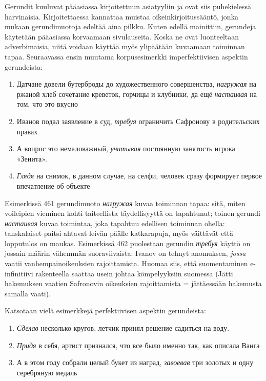 \documentclass[]{scrartcl}
\providecommand{\tightlist}{%
  \setlength{\itemsep}{0pt}\setlength{\parskip}{0pt}}
\begin{document}
Gerundit kuuluvat pääasiassa kirjoitettuun asiatyyliin ja ovat siis
puhekielessä harvinaisia. Kirjoitettaessa kannattaa muistaa
oikeinkirjoitussääntö, jonka mukaan gerundimuotoja edeltää aina pilkku.
Kuten edellä mainittiin, gerundeja käytetään pääasiassa korvaamaan
sivulauseita. Koska ne ovat luonteeltaan adverbimaisia, niitä voidaan
käyttää myös ylipäätään kuvaamaan toiminnan tapaa. Seuraavassa ensin
muutama korpusesimerkki imperfektiivisen aspektin gerundeista:

\begin{enumerate}
\def\labelenumi{(\arabic{enumi})}
\setcounter{enumi}{460}
\tightlist
\item
  Датчане довели бутерброды до художественного совершенства,
  \emph{нагружая} на ржаной хлеб сочетание креветок, горчицы и клубники,
  да ещё \emph{настаивая} на том, что это вкусно
\item
  Иванов подал заявление в суд, \emph{требуя} ограничить Сафронову в
  родительских правах
\item
  А вопрос это немаловажный, \emph{учитывая} постоянную занятость игрока
  «Зенита».
\item
  \emph{Глядя} на снимок, в данном случае, на селфи, человек сразу
  формирует первое впечатление об объекте
\end{enumerate}

Esimerkissä 461 gerundimuoto \emph{нагружая} kuvaa toiminnan tapaa:
sitä, miten voileipien vieminen kohti taiteellista täydellisyyttä on
tapahtunut; toinen gerundi \emph{настаивая} kuvaa toimintaa, joka
tapahtuu edellisen toiminnan ohella: tanskalaiset paitsi ahtavat leivän
päälle katkarapuja, myös väittävät että lopputulos on maukas.
Esimerkissä 462 puolestaan gerundin \emph{требуя} käyttö on jossain
määrin vähemmän suoraviivaista: Ivanov on tehnyt anomuksen, \emph{jossa}
vaatii vanhempainoikeuksien rajoittamista. Huomaa siis, että
suomentaminen e-infinitiivi rakenteella saattaa usein johtaa
kömpelyyksiin suomessa (Jätti hakemuksen vaatien Safronovin oikeuksien
rajoittamista = jättäessään hakemusta samalla vaati).

Katsotaan vielä esimerkkejä perfektiivisen aspektin gerundeista:

\begin{enumerate}
\def\labelenumi{(\arabic{enumi})}
\setcounter{enumi}{464}
\tightlist
\item
  \emph{Сделав} несколько кругов, летчик принял решение садиться на
  воду.
\item
  \emph{Придя} в себя, артист признался, что все было именно так, как
  описала Ванга
\item
  А в этом году собрали целый букет из наград, \emph{завоевав} три
  золотых и одну серебряную медаль
\end{enumerate}
\end{document}
